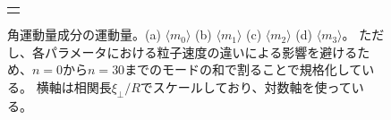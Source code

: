 \documentclass[/Users/ikedahajime/GitHub/reserch/master_report/thesis]{subfiles}
\begin{document}
\begin{figure}[htbp]
\begin{tabular}{c}
\begin{minipage}{0.24\hsize}
        \end{minipage}
    \end{tabular}
    \caption[Vel_modes]
    {
        角運動量成分の運動量。(a) $\langle m_0 \rangle$ (b) $\langle m_1 \rangle$ (c) $\langle m_2 \rangle$ (d) $\langle m_3 \rangle$。
        ただし、各パラメータにおける粒子速度の違いによる影響を避けるため、$n=0$から$n=30$までのモードの和で割ることで規格化している。
        横軸は相関長$\xi_\bot/R$\cite{kurodaLongrangeTranslationalOrder2024}でスケールしており、対数軸を使っている。
    }
    \label{fig:chiral_vel_modes}
\end{figure}

\ifSubfilesClassLoaded{
    \printbibliography[title=参考文献]
    }{}
\end{document}
